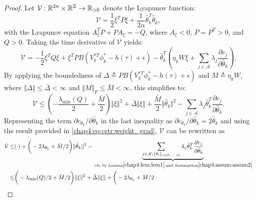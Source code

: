 \begin{proof}
Let $\mathcal{V}: \mathbb{R}^{2n} \times \mathbb{R}^{\Xi} \to \mathbb{R}_{>0}$ denote the Lyapunov function:
\begin{equation}
    \mathcal{V} = \frac{1}{2} \xi^T P \xi + \frac{1}{2 \alpha} \hat{\theta}_k^T \hat{\theta}_k,
\end{equation}
with the Lyapunov equation $A_\xi^T P + P A_\xi = -Q$, where $A_\xi < 0$, $P = P^T > 0$, and $Q > 0$.
Taking the time derivative of $\mathcal{V}$ yields:
\begin{equation}
    \dot{\mathcal{V}} 
    = -\frac{1}{2} \xi^T Q \xi + \xi^T P B (V_k^{*T} \phi_k^* - h(\tau) + \epsilon)
    - \hat{\theta}_k^T \left( \eta_k W \xi + \sum_{j \in \mathcal{A}} \lambda_j \frac{\partial c_j}{\partial \hat{\theta}_k} \right)
    .
\end{equation}
By applying the boundedness of $\Delta \triangleq P B (V_k^{*T} \phi_k^* - h(\tau) + \epsilon)$ and $M \triangleq \eta_k W$, where $\Vert \Delta \Vert \leq \bar{\Delta} < \infty$ and $\Vert M \Vert_F \leq \bar{M} < \infty$, this simplifies to:
\begin{equation}
    \dot{\mathcal{V}} 
    \leq \left( -\frac{\lambda_{\text{min}}(Q)}{2} + \frac{\bar{M}}{2} \right) \Vert \xi \Vert^2 + \bar{\Delta} \Vert \xi \Vert 
        + \frac{\bar{M}}{2} \Vert \hat{\theta}_k \Vert^2 - \sum_{j \in \mathcal{A}} \lambda_j \hat{\theta}_k^T \frac{\partial c_j}{\partial \hat{\theta}_k}
        .
    \label{chap4:eq:V1_dot}
\end{equation}
Representing the term $\partial c_{\theta_k}/\partial \hat\theta_k$ in the last inequality as $\partial c_{\theta_k}/\partial \hat\theta_k=2\hat\theta_k$ and using the result provided in \eqref{chap4:eq:cstr:weight_grad}, $\dot {\mathcal V}$ can be rewritten as
\begin{equation}
    \begin{aligned}
        \dot {\mathcal V} \le&
        (\cdot) + 
        \bigg(
            -2\lambda _{\theta_k}+{\bar M}/{2}
        \bigg)
        \Vert\hat\theta_k\Vert^2 
        - \underbrace{
        \sum_{j\in\mathcal{A}\setminus \{\theta_i\}_{i\in[0,\cdots,k]}}\lambda_j\hat\theta_k^T{\partial c_j\over\partial \hat\theta_k}
        }_{>0, \text{\;by Lemma} \ref{chap4:lem:lem1} \text{\;and\;} \text{Assumption} \ref{chap4:assum:assum2}}	
        \\
        \le&
        \bigg(
            -{\lambda_\text{min}(Q)}/{2}+{\bar M}/{2}
        \bigg)
        \Vert\xi\Vert^2
        +\bar \Delta \Vert \xi\Vert 
        + 
        \bigg(
            -2\lambda _{\theta_k}+{\bar M}/{2}

\end{aligned}
\end{equation}
\end{proof}
